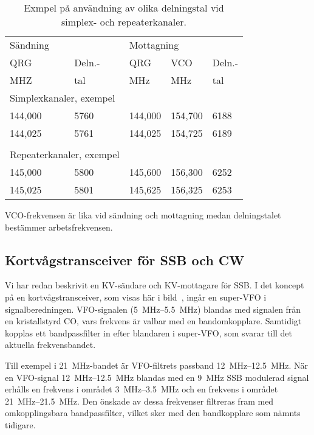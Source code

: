 \begin{table}[ht]
\begin{center}
  \begin{tabular}{ll|lll}
    \multicolumn{2}{l|}{Sändning} &
    \multicolumn{3}{l}{Mottagning} \\
    QRG & Deln.- & QRG & VCO & Deln.- \\
    MHZ & tal    & MHz & MHz & tal \\
    \hline
    \multicolumn{2}{p{7em}|}{Simplexkanaler, exempel} & & & \\
    144,000 & 5760 & 144,000 & 154,700 & 6188 \\
    144,025 & 5761 & 144,025 & 154,725 & 6189 \\
    & & & & \\
    \multicolumn{2}{p{7em}|}{Repeaterkanaler, exempel} & & & \\
    145,000 & 5800 & 145,600 & 156,300 & 6252 \\
    145,025 & 5801 & 145,625 & 156,325 & 6253 \\
  \end{tabular}
\end{center}
\caption{Exmpel på användning av olika delningstal vid simplex- och repeaterkanaler.}
\label{tab:delningstal}
\end{table}

VCO-frekvensen är lika vid sändning och mottagning medan delningstalet
bestämmer arbetsfrekvensen.

\newpage
\subsection{Kortvågstransceiver för SSB och CW}


Vi har redan beskrivit en KV-sändare och KV-mot\-tag\-are för SSB.
I det koncept på en kortvågstransceiver, som visas här i
bild~, ingår en super-VFO i signalberedningen.
VFO-signalen (\SIrange{5}{5,5}{\mega\hertz}) blandas med signalen från en
kristallstyrd CO, vars frekvens är valbar med en bandomkopplare.
Samtidigt kopplas ett bandpassfilter in efter blandaren i super-VFO, som svarar
till det aktuella frekvensbandet.

Till exempel i \qty{21}{\mega\hertz}-bandet är VFO-filtrets passband
\SIrange{12}{12,5}{\mega\hertz}.
När en VFO-signal \SIrange{12}{12,5}{\mega\hertz} blandas med en
\qty{9}{\mega\hertz} SSB modulerad signal erhålls en frekvens i området
\SIrange{3}{3,5}{\mega\hertz} och en frekvens i området
\SIrange{21}{21,5}{\mega\hertz}.
Den önskade av dessa frekvenser filtreras fram med omkopplingsbara
bandpassfilter, vilket sker med den bandkopplare som nämnts tidigare.

